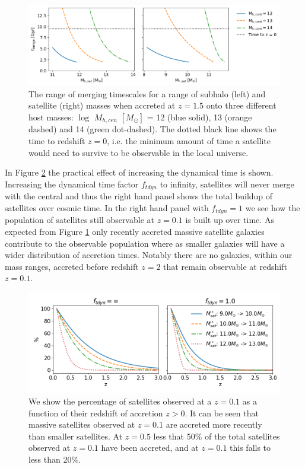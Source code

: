 \begin{figure}[h]
	\centering
	\includegraphics[width = \linewidth]{Figures/Chapter3/Tdyn_M.png}
	\caption{The range of merging timescales for a range of subhalo (left) and satellite (right) masses when accreted at $z = 1.5$ onto three different host masses: $\log$ $M_{h, cen}$ $[M_{\odot}]$ = 12 (blue solid), 13 (orange dashed) and 14 (green dot-dashed). The dotted black line shows the time to redshift $z = 0$, i.e. the minimum amount of time a satellite would need to survive to be observable in the local universe.}
	\label{fig:Tdyn_M}
\end{figure}

In Figure \ref{fig:AccretionTime} the practical effect of increasing the dynamical time is shown. Increasing the dynamical time factor $f_{tdyn}$ to infinity, satellites will never merge with the central and thus the right hand panel shows the total buildup of satellites over cosmic time. In the right hand panel with $f_{tdyn} = 1$ we see how the population of satellites still observable at $z=0.1$ is built up over time. As expected from Figure \ref{fig:Tdyn_M} only recently accreted massive satellite galaxies contribute to the observable population where as smaller galaxies will have a wider distribution of accretion times. Notably there are no galaxies, within our mass ranges, accreted before redshift $z=2$ that remain observable at redshift $z=0.1$.

\begin{figure}[h]
	\centering
	\includegraphics[width = \linewidth]{Figures/Chapter3/AccretedSatellitePercentage.png}
	\caption{We show the percentage of satellites observed at a $z = 0.1$ as a function of their redshift of accretion $z > 0$. It can be seen that massive satellites observed at $z = 0.1$ are accreted more recently than smaller satellites. At $z = 0.5$ less that 50\% of the total satellites observed at $z = 0.1$ have been accreted, and at $z = 0.1$ this falls to less than 20\%. }
	\label{fig:AccretionTime}
\end{figure}

